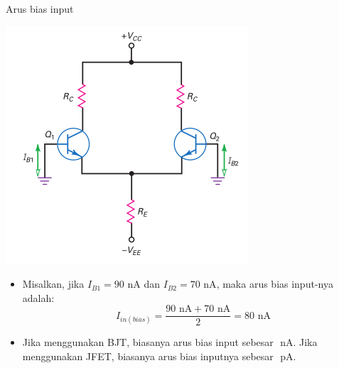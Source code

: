 \documentclass[aspectratio=169]{beamer}
\begin{document}
\begin{frame}{Arus bias input}
	\begin{multicols}{2}
		\begin{center}
			\includegraphics[height=0.7\textheight]{gambar/01.different_base_currents}
		\end{center}
		\columnbreak
		\begin{itemize}
			\item Misalkan, jika $ I_{B1} = 90 \text{ nA} $ dan $ I_{B2} = 70 \text{ nA} $, maka arus bias input-nya adalah:
			\[ I_{in(bias)} = \frac{ 90 \text{ nA} + 70 \text{ nA} }{2} = 80 \text{ nA}\]
			\item Jika menggunakan BJT, biasanya arus bias input sebesar $ \text{ nA} $. Jika menggunakan JFET, biasanya arus bias inputnya sebesar $ \text{ pA} $.
		\end{itemize}
	\end{multicols}
\end{frame}
\end{document}
